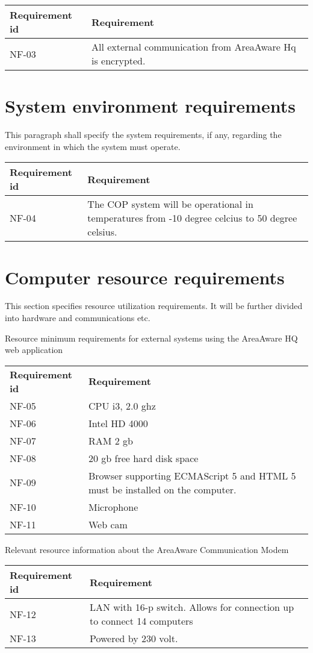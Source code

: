 \begin{longtable}{| p{3.2cm} |  p{10cm} | }
	\hline
	\textbf{Requirement id} &  \textbf{Requirement } \\
	\hline
	NF-03 &All external communication from AreaAware Hq is encrypted.  \\
	\hline
\end{longtable}

\label{sec_nonFunc3}
\section{System environment requirements}
This paragraph shall specify the system requirements, if any, regarding the environment in which the system must operate.

\begin{longtable}{| p{3.2cm} |  p{10cm} | }
	\hline
	\textbf{Requirement id} &  \textbf{Requirement } \\
	\hline
	NF-04 & The COP system will be operational in temperatures from -10 degree celcius to 50 degree celsius.  \\
	\hline
\end{longtable}

\label{sec_nonFunc4}
\section{Computer resource requirements}
This section specifies resource utilization requirements. It will be further divided into hardware and communications etc.

Resource minimum requirements for external systems using the AreaAware HQ web application
\begin{longtable}{| p{3.2cm} |  p{10cm} | }
	\hline
	\textbf{Requirement id} &  \textbf{Requirement } \\
	NF-05 & CPU i3, 2.0 ghz \\
	\hline
	NF-06 & Intel HD 4000 \\
	\hline
	NF-07 & RAM 2 gb \\
	\hline
	NF-08 & 20 gb free hard disk space \\
	\hline
	NF-09 & Browser supporting ECMAScript 5 and HTML 5 must be installed on the computer. \\
	\hline
	NF-10 & Microphone \\
	\hline
	NF-11 & Web cam \\
	\hline
\end{longtable}


Relevant resource information about the AreaAware Communication Modem
\begin{longtable}{| p{3.2cm} |  p{10cm} | }
	\hline
	\textbf{Requirement id} &  \textbf{Requirement } \\
	\hline
	NF-12 & LAN with 16-p switch. Allows for connection up to connect 14 computers \\
	\hline
	NF-13 & Powered by 230 volt. \\
	\hline
\end{longtable}


